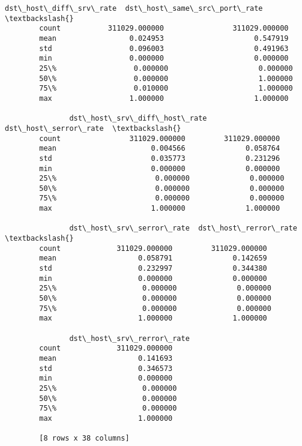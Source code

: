 \documentclass[11pt]{article}
\begin{document}
\begin{Verbatim}[commandchars=\\\{\}]
               dst\_host\_diff\_srv\_rate  dst\_host\_same\_src\_port\_rate  \textbackslash{}
        count           311029.000000                311029.000000   
        mean                 0.024953                     0.547919   
        std                  0.096003                     0.491963   
        min                  0.000000                     0.000000   
        25\%                  0.000000                     0.000000   
        50\%                  0.000000                     1.000000   
        75\%                  0.010000                     1.000000   
        max                  1.000000                     1.000000   
        
               dst\_host\_srv\_diff\_host\_rate  dst\_host\_serror\_rate  \textbackslash{}
        count                311029.000000         311029.000000   
        mean                      0.004566              0.058764   
        std                       0.035773              0.231296   
        min                       0.000000              0.000000   
        25\%                       0.000000              0.000000   
        50\%                       0.000000              0.000000   
        75\%                       0.000000              0.000000   
        max                       1.000000              1.000000   
        
               dst\_host\_srv\_serror\_rate  dst\_host\_rerror\_rate  \textbackslash{}
        count             311029.000000         311029.000000   
        mean                   0.058791              0.142659   
        std                    0.232997              0.344380   
        min                    0.000000              0.000000   
        25\%                    0.000000              0.000000   
        50\%                    0.000000              0.000000   
        75\%                    0.000000              0.000000   
        max                    1.000000              1.000000   
        
               dst\_host\_srv\_rerror\_rate  
        count             311029.000000  
        mean                   0.141693  
        std                    0.346573  
        min                    0.000000  
        25\%                    0.000000  
        50\%                    0.000000  
        75\%                    0.000000  
        max                    1.000000  
        
        [8 rows x 38 columns]
\end{Verbatim}
            
\end{document}
